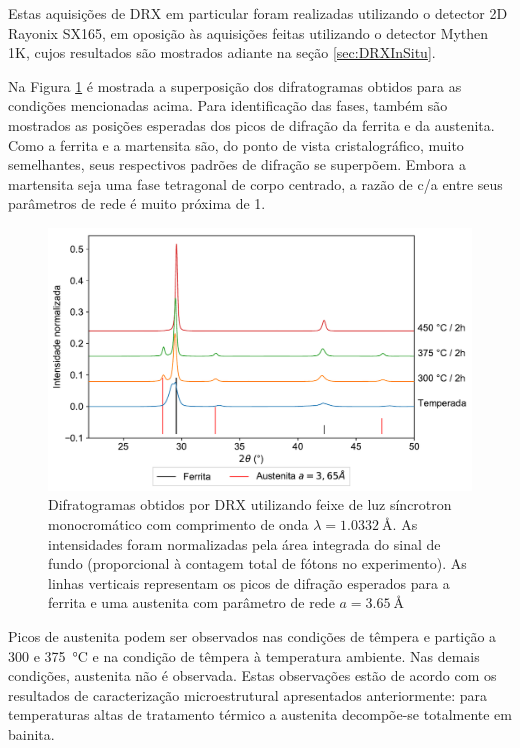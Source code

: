 Estas aquisições de DRX em particular foram realizadas utilizando o detector 2D Rayonix SX165, em oposição às aquisições  feitas utilizando o detector Mythen 1K, cujos resultados são mostrados adiante na seção \ref{sec:DRXInSitu}.

Na Figura \ref{fig:Rayonix_completo} é mostrada a superposição dos difratogramas obtidos para as condições mencionadas acima. Para identificação das fases, também são mostrados as posições esperadas dos picos de difração da ferrita e da austenita. Como a ferrita e a martensita são, do ponto de vista cristalográfico, muito semelhantes, seus respectivos padrões de difração se superpõem. Embora a martensita seja uma fase tetragonal de corpo centrado, a razão de c/a entre seus parâmetros de rede é muito próxima de 1.

\begin{figure}
  \centering
  \includegraphics[width=\textwidth]{img/XTMS/selected_diffractograms.pdf}
  \caption{Difratogramas obtidos por DRX utilizando feixe de luz síncrotron monocromático com comprimento de onda $\lambda = \SI{1.0332}{\text{\AA}}$. As intensidades foram normalizadas pela área integrada do sinal de fundo (proporcional à contagem total de fótons no experimento). As linhas verticais representam os picos de difração esperados para a ferrita e uma austenita com parâmetro de rede $a = \SI{3.65}{\text{\AA}}$}
  \label{fig:Rayonix_completo}
\end{figure}

Picos de austenita podem ser observados nas condições de têmpera e partição a 300 e \SI{375}{\degreeCelsius} e na condição de têmpera à temperatura ambiente. Nas demais condições, austenita não é observada. Estas observações estão de acordo com os resultados de caracterização microestrutural apresentados anteriormente: para temperaturas altas de tratamento térmico a austenita decompõe-se totalmente em bainita.

